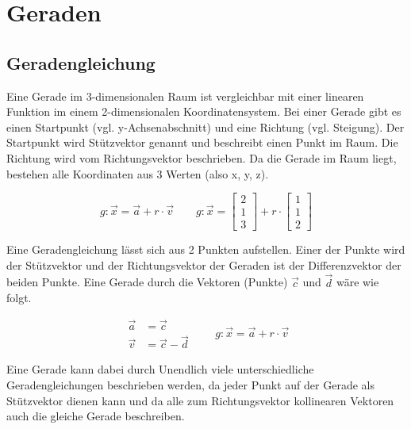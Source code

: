 \section{Geraden}
\subsection{Geradengleichung}

Eine Gerade im 3-dimensionalen Raum ist vergleichbar mit einer linearen Funktion im einem 2-dimensionalen
Koordinatensystem. Bei einer Gerade gibt es einen Startpunkt (vgl. y-Achsenabschnitt)
und eine Richtung (vgl. Steigung). Der Startpunkt wird Stützvektor genannt und beschreibt einen
Punkt im Raum. Die Richtung wird vom Richtungsvektor beschrieben. Da die Gerade im Raum
liegt, bestehen alle Koordinaten aus 3 Werten (also x, y, z).

\begin{equation*}
    g: \vec{x} = \vec{a} + r \cdot \vec{v}
    \qquad g: \vec{x} =
    \begin{bmatrix}
        2 \\
        1 \\
        3
    \end{bmatrix}
    +
    r \cdot
    \begin{bmatrix}
        1 \\
        1 \\
        2
    \end{bmatrix}
\end{equation*}

Eine Geradengleichung lässt sich aus 2 Punkten aufstellen. Einer der Punkte wird der
Stützvektor und der Richtungsvektor der Geraden ist der Differenzvektor der beiden Punkte.
Eine Gerade durch die Vektoren (Punkte) $\vec{c}$ und $\vec{d}$ wäre wie folgt.

\begin{equation*}
    \begin{aligned}
        \vec{a} & = \vec{c} \\
        \vec{v} & = \vec{c} - \vec{d}
    \end{aligned}
    \qquad g: \vec{x} = \vec{a} + r \cdot \vec{v}
\end{equation*}

Eine Gerade kann dabei durch Unendlich viele unterschiedliche Geradengleichungen
beschrieben werden, da jeder Punkt auf der Gerade als Stützvektor dienen kann
und da alle zum Richtungsvektor kollinearen Vektoren auch die gleiche Gerade
beschreiben.

